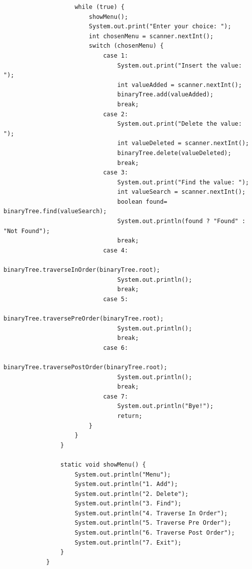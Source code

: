\documentclass[12pt,titlepage]{article}
\begin{document}
\begin{enumerate}
{\begin{verbatim}
                    while (true) {
                        showMenu();
                        System.out.print("Enter your choice: ");
                        int chosenMenu = scanner.nextInt();
                        switch (chosenMenu) {
                            case 1:
                                System.out.print("Insert the value: ");
                                int valueAdded = scanner.nextInt();
                                binaryTree.add(valueAdded);
                                break;
                            case 2:
                                System.out.print("Delete the value: ");
                                int valueDeleted = scanner.nextInt();
                                binaryTree.delete(valueDeleted);
                                break;
                            case 3:
                                System.out.print("Find the value: ");
                                int valueSearch = scanner.nextInt();
                                boolean found= binaryTree.find(valueSearch);
                                System.out.println(found ? "Found" : "Not Found");
                                break;
                            case 4:
                                binaryTree.traverseInOrder(binaryTree.root);
                                System.out.println();
                                break;
                            case 5:
                                binaryTree.traversePreOrder(binaryTree.root);
                                System.out.println();
                                break;
                            case 6:
                                binaryTree.traversePostOrder(binaryTree.root);
                                System.out.println();
                                break;
                            case 7:
                                System.out.println("Bye!");
                                return;
                        }
                    }
                }

                static void showMenu() {
                    System.out.println("Menu");
                    System.out.println("1. Add");
                    System.out.println("2. Delete");
                    System.out.println("3. Find");
                    System.out.println("4. Traverse In Order");
                    System.out.println("5. Traverse Pre Order");
                    System.out.println("6. Traverse Post Order");
                    System.out.println("7. Exit");
                }
            }
        \end{verbatim}

}
\end{enumerate}
\end{document}
